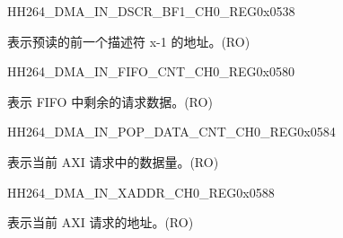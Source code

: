     
    \begin{register}{H}{H264\_DMA\_IN\_DSCR\_BF1\_CH0\_REG}{0x0538}\label{regdesc:H264DMAINDSCRBF1CH0REG}
    \regnewline%
    \begin{regdesc}\begin{reglist}
    \label{fielddesc:H264DMAINLINKDSCRBF1CH0}\item [H264\_DMA\_INLINK\_DSCR\_BF1\_CH0] 表示预读的前一个描述符 x-1 的地址。(RO)
    \end{reglist}\end{regdesc}
    \end{register}
    
    \begin{register}{H}{H264\_DMA\_IN\_FIFO\_CNT\_CH0\_REG}{0x0580}\label{regdesc:H264DMAINFIFOCNTCH0REG}
    \regnewline%
    \begin{regdesc}\begin{reglist}
    \label{fielddesc:H264DMAINCMDFIFOINFIFOCNTCH0}\item [H264\_DMA\_IN\_CMDFIFO\_INFIFO\_CNT\_CH0] 表示 FIFO 中剩余的请求数据。(RO)
    \end{reglist}\end{regdesc}
    \end{register}
    
    
    \begin{register}{H}{H264\_DMA\_IN\_POP\_DATA\_CNT\_CH0\_REG}{0x0584}\label{regdesc:H264DMAINPOPDATACNTCH0REG}
    \regnewline%
    \begin{regdesc}\begin{reglist}
    \label{fielddesc:H264DMAINCMDFIFOPOPDATACNTCH0}\item [H264\_DMA\_IN\_CMDFIFO\_POP\_DATA\_CNT\_CH0] 表示当前 AXI 请求中的数据量。(RO)
    \end{reglist}\end{regdesc}
    \end{register}
    
    
    \begin{register}{H}{H264\_DMA\_IN\_XADDR\_CH0\_REG}{0x0588}\label{regdesc:H264DMAINXADDRCH0REG}
    \regnewline%
    \begin{regdesc}\begin{reglist}
    \label{fielddesc:H264DMAINCMDFIFOXADDRCH0}\item [H264\_DMA\_IN\_CMDFIFO\_XADDR\_CH0] 表示当前 AXI 请求的地址。(RO)
    \end{reglist}\end{regdesc}
    \end{register}
    
